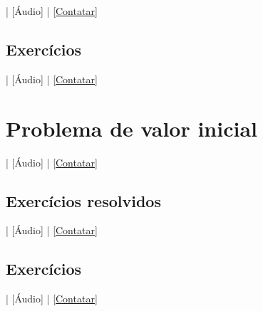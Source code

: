 \begin{flushright}
  [Vídeo] | [Áudio] | \href{https://phkonzen.github.io/notas/contato.html}{[Contatar]}
\end{flushright}

\emconstrucao

\subsection*{Exercícios}

\begin{flushright}
  [Vídeo] | [Áudio] | \href{https://phkonzen.github.io/notas/contato.html}{[Contatar]}
\end{flushright}

\emconstrucao

\section{Problema de valor inicial}\label{cap_apint_sec_pvi}

\begin{flushright}
  [Vídeo] | [Áudio] | \href{https://phkonzen.github.io/notas/contato.html}{[Contatar]}
\end{flushright}

\emconstrucao

\subsection*{Exercícios resolvidos}

\begin{flushright}
  [Vídeo] | [Áudio] | \href{https://phkonzen.github.io/notas/contato.html}{[Contatar]}
\end{flushright}

\emconstrucao

\subsection*{Exercícios}

\begin{flushright}
  [Vídeo] | [Áudio] | \href{https://phkonzen.github.io/notas/contato.html}{[Contatar]}
\end{flushright}

\emconstrucao
